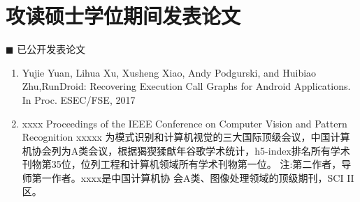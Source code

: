 \section*{攻读硕士学位期间发表论文}

\vskip 5mm

{\heiti $\blacksquare$ 已公开发表论文}\vskip 5mm

\begin{enumerate}

  \item Yujie Yuan, Lihua Xu, Xusheng Xiao, Andy Podgurski, and Huibiao Zhu,RunDroid: Recovering Execution Call Graphs for Android Applications. In Proc. ESEC/FSE, 2017
\item xxxx  Proceedings of the IEEE Conference on Computer Vision and Pattern Recognition xxxxx 为模式识别和计算机视觉的三大国际顶级会议，中国计算机协会列为A类会议，根据猲猰猱猷年谷歌学术统计，h5-index排名所有学术刊物第35位，位列工程和计算机领域所有学术刊物第一位。 
注:第二作者，导师第一作者。xxxx是中国计算机协 会A类、图像处理领域的顶级期刊，SCI II区。


\end{enumerate}



